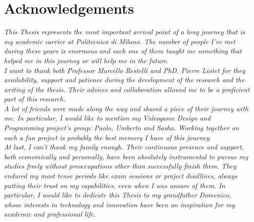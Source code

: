 \chapter*{Acknowledgements}
\textit{This Thesis represents the most important arrival point of a long journey that is my academic carrier at Politecnico di Milano. The number of people I've met during these years is enormous and each one of them taught me something that helped me in this journey or will help me in the future.}
\\
\textit{I want to thank both Professor Marcello Restelli and PhD. Pierre Liotet for they availability, support and patience during the development of the research and the writing of the thesis. Their advices and collaboration allowed me to be a proficient part of this research.}
\\
\textit{A lot of friends were made along the way and shared a piece of their journey with me. In particular, I would like to mention my Videogame Design and Programming project's group: Paolo, Umberto and Sasha. Working together on such a fun project is probably the best memory I have of this journey.}
\\
\textit{At last, I can't thank my family enough. Their continuous presence and support, both economically and personally, have been absolutely instrumental to pursue my studies freely without preoccupations other than successfully finish them. They endured my most tense periods like exam sessions or project deadlines, always putting their trust on my capabilities, even when I was unsure of them. In particular, I would like to dedicate this Thesis to my grandfather Domenico, whose interests in technology and innovation have been an inspiration for my academic and professional life.}